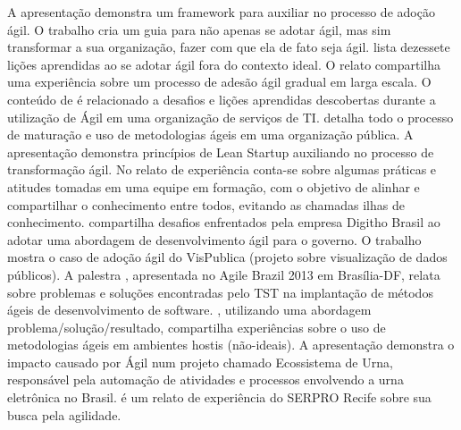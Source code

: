 A apresentação\cite{Ahmed2008} demonstra um framework para auxiliar no processo de adoção ágil. O trabalho \cite{Sahota2012} cria um guia para não apenas se adotar ágil, mas sim transformar a sua organização, fazer com que ela de fato seja ágil. \cite{Piegas2012} lista dezessete lições aprendidas ao se adotar ágil fora do contexto ideal. O relato \cite{Parzinello2012} compartilha uma experiência sobre um processo de adesão ágil gradual em larga escala. O conteúdo de \cite{Srinath2012} é relacionado a desafios e lições aprendidas descobertas durante a utilização de Ágil em uma organização de serviços de TI. \cite{Karaj2013} detalha todo o processo de maturação e uso de metodologias ágeis em uma organização pública. A apresentação \cite{Hui2013} demonstra princípios de Lean Startup auxiliando no processo de transformação ágil. No relato de experiência \cite{Valerio2013} conta-se sobre algumas práticas e atitudes tomadas em uma equipe em formação, com o objetivo de alinhar e compartilhar o conhecimento entre todos, evitando as chamadas ilhas de conhecimento. \cite{Stefano2013} compartilha desafios enfrentados pela empresa Digitho Brasil ao adotar uma abordagem de desenvolvimento ágil para o governo. O trabalho \cite{Rodrigues2013} mostra o caso de adoção ágil do VisPublica (projeto sobre visualização de dados públicos). A palestra \cite{Vieira2013}, apresentada no Agile Brazil 2013 em Brasília-DF, relata sobre problemas e soluções encontradas pelo TST na implantação de métodos ágeis de desenvolvimento de software. \cite{Queiroz2013}, utilizando uma abordagem problema/solução/resultado, compartilha experiências sobre o uso de metodologias ágeis em ambientes hostis (não-ideais). A apresentação \cite{Bastos2013} demonstra o impacto causado por Ágil num projeto chamado Ecossistema de Urna, responsável pela automação de atividades e processos envolvendo a urna eletrônica no Brasil. \cite{Maciel2013} é um relato de experiência do SERPRO Recife sobre sua busca pela agilidade.

%
